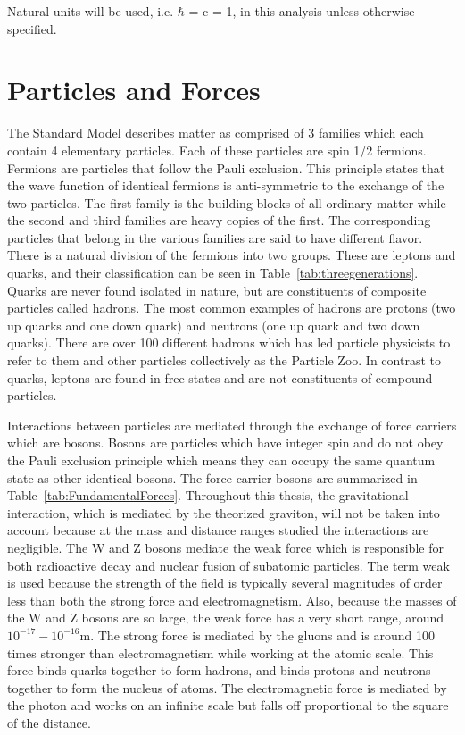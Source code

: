 Natural units will be used, i.e. $\hbar$ = c = 1, in this analysis unless otherwise specified.


\section{Particles and Forces}

The Standard Model describes matter as comprised of 3 families which each contain 4 elementary particles.  Each of these particles are spin 1/2 fermions. Fermions are particles that follow the Pauli exclusion.  This principle states that the wave function of identical fermions is anti-symmetric to the exchange of the two particles\cite{Griffiths:2004}.  The first family is the building blocks of all ordinary matter while the second and third families are heavy copies of the first.  The corresponding particles that belong in the various families are said to have different flavor.  There is a natural division of the fermions into two groups.  These are leptons and quarks, and their classification can be seen in Table~\ref{tab:threegenerations}.  Quarks are never found isolated in nature, but are constituents of composite particles called hadrons.  The most common examples of hadrons are protons (two up quarks and one down quark) and neutrons (one up quark and two down quarks).  There are over 100 different hadrons which has led particle physicists to refer to them and other particles collectively as the Particle Zoo.  In contrast to quarks, leptons are found in free states and are not constituents of compound particles.

Interactions between particles are mediated through the exchange of force carriers which are bosons.  Bosons are particles which have integer spin and do not obey the Pauli exclusion principle which means they can occupy the same quantum state as other identical bosons.  The force carrier bosons are summarized in Table~\ref{tab:FundamentalForces}.  Throughout this thesis, the gravitational interaction, which is mediated by the theorized graviton, will not be taken into account because at the mass and distance ranges studied the interactions are negligible. The W and Z bosons mediate the weak force which is responsible for both radioactive decay and nuclear fusion of subatomic particles. The term weak is used because the strength of the field is typically several magnitudes of order less than both the strong force and electromagnetism.  Also, because the masses of the W and Z bosons are so large, the weak force has a very short range, around $10^{-17} - 10^{-16}$m\cite{Christman:2001}.  The strong force is mediated by the gluons and is around 100 times stronger than electromagnetism while working at the atomic scale.  This force binds quarks together to form hadrons, and binds protons and neutrons together to form the nucleus of atoms. The electromagnetic force is mediated by the photon and works on an infinite scale but falls off proportional to the square of the distance.  

